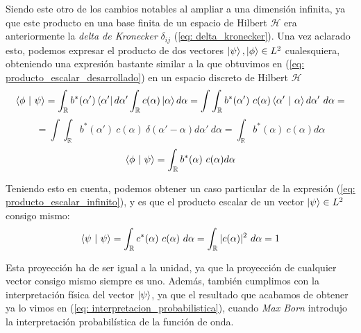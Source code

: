 \documentclass{article}
\numberwithin{equation}{section} %
\begin{document}
    \vspace{2.5mm}

    Siendo este otro de los cambios notables al ampliar a una dimensión infinita, ya que este producto en una base finita de un espacio de Hilbert \( \mathcal{H} \) era anteriormente la \textit{delta de Kronecker} \( \delta_{ij} \) (\ref{eq: delta_kronecker}). Una vez aclarado esto, podemos expresar el producto de dos vectores \( \ket{\psi}, \ket{\phi} \in L^{2} \) cualesquiera, obteniendo una expresión bastante similar a la que obtuvimos en (\ref{eq: producto_escalar_desarrollado}) en un espacio discreto de Hilbert \( \mathcal{H} \)
    \begin{equation*}
        \braket{\phi \ | \ \psi} = \int_{\mathbb{R}} b^{*} (\alpha') \bra{\alpha'} d \alpha' \int_{\mathbb{R}} c (\alpha) \ket{\alpha} d \alpha = \int\int_{\mathbb{R}} b^{*} (\alpha') \ c (\alpha) \braket{\alpha' \ | \ \alpha} d \alpha' \ d \alpha =
    \end{equation*}
    \begin{equation*}
        = \int\int_{\mathbb{R}} b^{*} (\alpha') \ c (\alpha) \ \delta(\alpha' - \alpha) d \alpha' \ d \alpha = \int_{\mathbb{R}} b^{*} (\alpha) \ c (\alpha) d \alpha
    \end{equation*}
    \begin{equation}
        \braket{\phi \ | \ \psi} = \int_{\mathbb{R}} b^{*} (\alpha) \ c (\alpha) d \alpha
        \label{eq: producto_escalar_infinito}
    \end{equation}

    \vspace{2.5mm}

    Teniendo esto en cuenta, podemos obtener un caso particular de la expresión (\ref{eq: producto_escalar_infinito}), y es que el producto escalar de un vector \( \ket{\psi} \in L^{2} \) consigo mismo:
    \begin{equation}
        \braket{\psi \ | \ \psi} = \int_{\mathbb{R}} c^{*} (\alpha) \ c (\alpha) \ d \alpha = \int_{\mathbb{R}} | c (\alpha) | ^ {2} \ d \alpha = 1
        \label{eq: producto_escalar_vector_mismo_l2}
    \end{equation}

    \vspace{2.5mm}

    Esta proyección ha de ser igual a la unidad, ya que la proyección de cualquier vector consigo mismo siempre es uno. Además, también cumplimos con la interpretación física del vector \( \ket{\psi} \), ya que el resultado que acabamos de obtener ya lo vimos en (\ref{eq: interpretacion_probabilistica}), cuando \textit{Max Born} introdujo la interpretación probabilística de la función de onda.
\end{document}
